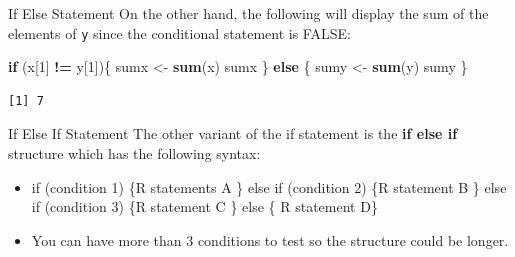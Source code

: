 \documentclass[
  ignorenonframetext,
]{beamer}
\newenvironment{Shaded}{\begin{snugshade}}{\end{snugshade}}
\newcommand{\ControlFlowTok}[1]{\textcolor[rgb]{0.13,0.29,0.53}{\textbf{#1}}}
\newcommand{\DecValTok}[1]{\textcolor[rgb]{0.00,0.00,0.81}{#1}}
\newcommand{\FunctionTok}[1]{\textcolor[rgb]{0.13,0.29,0.53}{\textbf{#1}}}
\newcommand{\NormalTok}[1]{#1}
\newcommand{\OtherTok}[1]{\textcolor[rgb]{0.56,0.35,0.01}{#1}}
\newcommand{\SpecialCharTok}[1]{\textcolor[rgb]{0.81,0.36,0.00}{\textbf{#1}}}
\begin{document}
\begin{frame}[fragile]{If Else Statement}
\protect\hypertarget{if-else-statement-1}{}
On the other hand, the following will display the sum of the elements of
\texttt{y} since the conditional statement is FALSE:

\small

\begin{Shaded}
\begin{Highlighting}[]
\ControlFlowTok{if}\NormalTok{ (x[}\DecValTok{1}\NormalTok{] }\SpecialCharTok{!=}\NormalTok{ y[}\DecValTok{1}\NormalTok{])\{}
\NormalTok{  sumx }\OtherTok{\textless{}{-}} \FunctionTok{sum}\NormalTok{(x)}
\NormalTok{  sumx}
\NormalTok{\} }\ControlFlowTok{else}\NormalTok{ \{}
\NormalTok{  sumy }\OtherTok{\textless{}{-}} \FunctionTok{sum}\NormalTok{(y)}
\NormalTok{  sumy}
\NormalTok{\}}
\end{Highlighting}
\end{Shaded}

\begin{verbatim}
[1] 7
\end{verbatim}

\normalsize
\end{frame}

\begin{frame}{If Else If Statement}
\protect\hypertarget{if-else-if-statement}{}
The other variant of the if statement is the \textbf{if else if}
structure which has the following syntax:

\begin{itemize}
\item
  if (condition 1) \{R statements A \} else if (condition 2) \{R
  statement B \} else if (condition 3) \{R statement C \} else \{ R
  statement D\}
\item
  You can have more than 3 conditions to test so the structure could be
  longer.
\end{itemize}
\end{frame}
\end{document}
